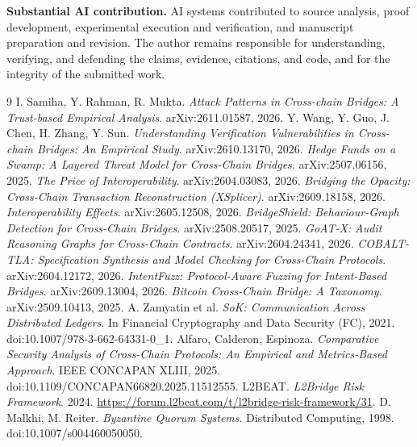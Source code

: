 \documentclass[10pt,a4paper]{article}
\begin{document}
\textbf{Substantial AI contribution.} AI systems contributed to source analysis, proof development,
experimental execution and verification, and manuscript preparation and revision. The author remains
responsible for understanding, verifying, and defending the claims, evidence, citations, and code, and for
the integrity of the submitted work.
\begin{thebibliography}{9}
 I. Samiha, Y. Rahman, R. Mukta. \emph{Attack Patterns in Cross-chain Bridges: A Trust-based Empirical
Analysis}. arXiv:2611.01587, 2026.
 Y. Wang, Y. Guo, J. Chen, H. Zhang, Y. Sun. \emph{Understanding Verification Vulnerabilities
in Cross-chain Bridges: An Empirical Study}. arXiv:2610.13170, 2026.
 \emph{Hedge Funds on a Swamp: A Layered Threat Model for Cross-Chain Bridges}.
arXiv:2507.06156, 2025.
 \emph{The Price of Interoperability}. arXiv:2604.03083, 2026.
 \emph{Bridging the Opacity: Cross-Chain Transaction Reconstruction (XSplicer)}.
arXiv:2609.18158, 2026.
 \emph{Interoperability Effects}. arXiv:2605.12508, 2026.
 \emph{BridgeShield: Behaviour-Graph Detection for Cross-Chain Bridges}.
arXiv:2508.20517, 2025.
 \emph{GoAT-X: Audit Reasoning Graphs for Cross-Chain Contracts}. arXiv:2604.24341, 2026.
 \emph{COBALT-TLA: Specification Synthesis and Model Checking for Cross-Chain
Protocols}. arXiv:2604.12172, 2026.
 \emph{IntentFuzz: Protocol-Aware Fuzzing for Intent-Based Bridges}. arXiv:2609.13004,
2026.
 \emph{Bitcoin Cross-Chain Bridge: A Taxonomy}. arXiv:2509.10413, 2025.
 A. Zamyatin et al. \emph{SoK: Communication Across Distributed Ledgers}. In
Financial Cryptography and Data Security (FC), 2021. doi:10.1007/978-3-662-64331-0\_1.
 Alfaro, Calderon, Espinoza. \emph{Comparative Security Analysis of Cross-Chain
Protocols: An Empirical and Metrics-Based Approach}. IEEE CONCAPAN XLIII, 2025. doi:10.1109/CONCAPAN66820.2025.11512555.
 L2BEAT. \emph{L2Bridge Risk Framework}. 2024. \url{https://forum.l2beat.com/t/l2bridge-risk-framework/31}.
 D. Malkhi, M. Reiter. \emph{Byzantine Quorum Systems}. Distributed Computing, 1998.
doi:10.1007/s004460050050.
\end{thebibliography}

\appendix
\end{document}
